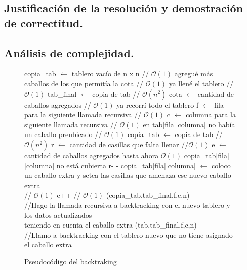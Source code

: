 
\vspace*{0.6cm}

\subsection{Justificación de la resolución y demostración de correctitud.}

\vspace*{0.3cm}


\vspace*{0.6cm}

\subsection{Análisis de complejidad.}

\vspace*{0.3cm}


\begin{figure}
\begin{codebox}
\li copia_tab $\leftarrow$ tablero vacío de n x n // $\mathcal{O}(1)$
\li \If agregué más caballos de los que permitía la cota   // $\mathcal{O}(1)$
\li \quad \Return   
\li \If ya llené el tablero                                // $\mathcal{O}(1)$
\li \quad tab_final $\leftarrow$ copia de tab              // $\mathcal{O}(n^2)$
\li \quad cota $\leftarrow$ cantidad de caballos agregados        // $\mathcal{O}(1)$
\li \quad \Return
\li \If ya recorrí todo el tablero
\li \quad \Return
\li f $\leftarrow$ fila para la siguiente llamada recursiva  // $\mathcal{O}(1)$
\li c $\leftarrow$ columna para la siguiente llamada recursiva  // $\mathcal{O}(1)$
\li \If en tab[fila][columna] no había un caballo preubicado      // $\mathcal{O}(1)$
\li \quad copia_tab $\leftarrow$ copia de tab              // $\mathcal{O}(n^2)$
\li \quad r $\leftarrow$ cantidad de casillas que falta llenar  //$\mathcal{O}(1)$
\li \quad e $\leftarrow$ cantidad de caballos agregados hasta ahora $\mathcal{O}(1)$
\li \quad \If copia_tab[fila][columna] no está cubierta
\li \quad \quad r- -
\li \quad copia_tab[fila][columna] $\leftarrow$ coloco un caballo extra y setea las casillas que amenaza ese nuevo caballo extra    \\   // $\mathcal{O}(1)$
\li \quad e++          // $\mathcal{O}(1)$
\li {}(copia_tab,tab_final,f,c,n) \\
//Hago la llamada recursiva a backtracking con el nuevo tablero y los datos actualizados \\
teniendo en cuenta el caballo extra
(tab,tab_final,f,c,n)\\
//Llamo a backtracking con el tablero nuevo que no tiene asignado el caballo extra
\end{codebox}
\caption{Pseudocódigo del backtraking}\label{code:backtraking}
\end{figure}
\FloatBarrier

